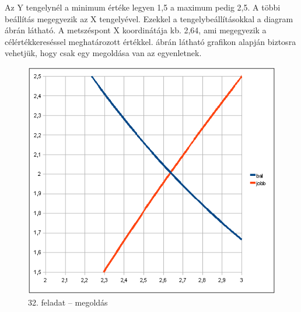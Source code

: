 Az Y tengelynél a minimum értéke legyen 1,5 a maximum pedig 2,5. A
többi beállítás megegyezik az X tengelyével. Ezekkel a
tengelybeállításokkal a diagram  ábrán látható.
A metszéspont X koordinátája kb. 2,64, ami megegyezik a
célértékkereséssel meghatározott értékkel. 
ábrán látható grafikon alapján biztosra vehetjük, hogy csak
egy megoldása van az egyenletnek.

\begin{figure}[!h]
\begin{center}
\includegraphics[width=12.203cm]{oocalcv2-img144.png}
\caption{32. feladat -- megoldás}\label{32-feladatMegoldás}
\end{center}
\end{figure}

